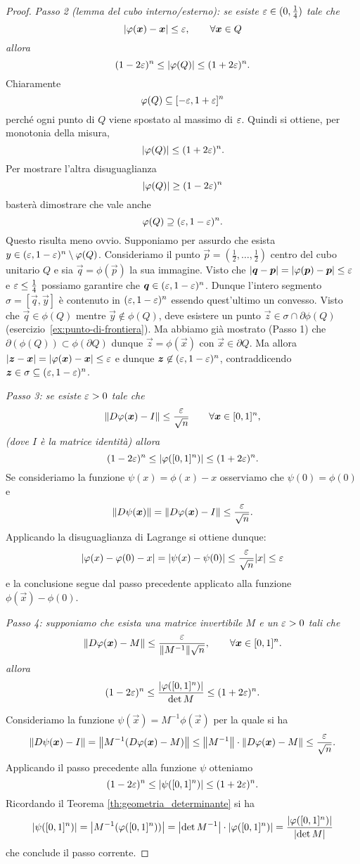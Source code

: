\begin{proof}
\emph{Passo 2 (lemma del cubo interno/esterno): 
se esiste $\varepsilon\in(0,\frac 1 4)$ tale che 
\[
  {\left|\varphi(\boldsymbol x)-\boldsymbol x\right|} \le \varepsilon, \qquad \forall \boldsymbol x \in Q
\]
allora }
\[
  (1-2\varepsilon)^n
  \le {\left|\varphi(Q)\right|}
  \le (1+2\varepsilon)^n.
\]
Chiaramente 
\[
    \varphi(Q) \subseteq [-\varepsilon,1+\varepsilon]^n
\]
perché ogni punto di $Q$ viene spostato al massimo di $\varepsilon$. 
Quindi si ottiene, per monotonia della misura,
\[
    {\left|\varphi(Q)\right|} \le (1+2\varepsilon)^n.
\]
Per mostrare l'altra disuguaglianza  
\[
   {\left|\varphi(Q)\right|} \ge (1-2\varepsilon)^n
\]
basterà dimostrare che vale anche 
\[
  \varphi(Q) \supseteq (\varepsilon,1-\varepsilon)^n.
\]
Questo risulta meno ovvio.
Supponiamo per assurdo che esista $y \in (\varepsilon,1-\varepsilon)^n \setminus \varphi(Q)$.
Consideriamo il punto $\vec p=(\frac 12, \dots, \frac 12)$ centro 
del cubo unitario $Q$ e sia $\vec q=\phi(\vec p)$ la sua immagine. 
Visto che ${\left|\boldsymbol q-\boldsymbol p\right|} = {\left|\varphi(\boldsymbol p)-\boldsymbol p\right|} \le \varepsilon$ 
e $\varepsilon \le \frac 1 4$ possiamo garantire che
$\boldsymbol q \in (\varepsilon,1-\varepsilon)^n$.
Dunque l'intero segmento $\sigma = [\vec q,\vec y]$ è contenuto 
in $(\varepsilon,1-\varepsilon)^n$ essendo quest'ultimo un convesso.
Visto che $\vec q\in \phi(Q)$ mentre $\vec y \notin \phi(Q)$,
deve esistere un punto $\vec z\in \sigma\cap \partial \phi(Q)$
(esercizio~\ref{ex:punto-di-frontiera}).
Ma abbiamo già mostrato (Passo 1) che $\partial (\phi(Q)) \subset \phi(\partial Q)$
dunque $\vec z=\phi(\vec x)$ con $\vec x \in \partial Q$. 
Ma allora ${\left|\boldsymbol z-\boldsymbol x\right|} = {\left|\varphi(\boldsymbol x)- \boldsymbol x\right|} \le \varepsilon$ 
e dunque $\boldsymbol z\not \in (\varepsilon,1-\varepsilon)^n$, 
contraddicendo $\boldsymbol z \in \sigma \subseteq (\varepsilon,1-\varepsilon)^n$.

\emph{Passo 3: se esiste $\varepsilon>0$ tale che 
\[
  {\left\Vert  D\varphi(\boldsymbol x) - I\right\Vert} \le \frac{\varepsilon}{\sqrt n} \qquad \forall \boldsymbol x \in [0,1]^n,
\]
(dove $I$ è la matrice identità)
allora
\[
 (1-2\varepsilon)^n \le {\left|\varphi([0,1]^n)\right|} \le (1+2\varepsilon)^n.
\]
}
Se consideriamo la funzione $\psi(x) = \phi(x) - x$ osserviamo che $\psi(0)=\phi(0)$ e
\[
{\left\Vert D\psi(\boldsymbol x)\right\Vert} = {\left\Vert D\varphi(\boldsymbol x) -I\right\Vert} \le \frac{\varepsilon}{\sqrt n}.
\]
Applicando la disuguaglianza di Lagrange si ottiene dunque:
\[
{\left|\varphi(x) - \varphi(0) - x\right|} = {\left|\psi(x)-\psi(0)\right|} \le \frac {\varepsilon} {\sqrt n} {\left|x\right|} \le \varepsilon
\]
e la conclusione segue dal passo precedente applicato alla funzione $\phi(\vec x) - \phi(0)$.

\emph{Passo 4: supponiamo che esista una matrice invertibile $M$ e un $\varepsilon>0$ tali che
\[
  {\left\Vert D\varphi(\boldsymbol x) - M\right\Vert} \le \frac{\varepsilon}{{\left\Vert M^{-1}\right\Vert} \sqrt n}, \qquad \forall \boldsymbol x \in [0,1]^n.
\]
allora
\[
(1-2\varepsilon)^n \le \frac{{\left|\varphi([0,1]^n)\right|}}{\det M} \le (1+2\varepsilon)^n.
\]}

Consideriamo la funzione $\psi(\vec x) = M^{-1} \phi(\vec x)$ per la quale si ha  
\[
  {\left\Vert D\psi(\boldsymbol x)-I\right\Vert} 
  = {\left\Vert M^{-1} (D\varphi(\boldsymbol x)-M)\right\Vert} 
  \le {\left\Vert M^{-1}\right\Vert} \cdot {\left\Vert D\varphi(\boldsymbol x)-M\right\Vert}
  \le \frac{\varepsilon}{\sqrt n}.
\]
Applicando il passo precedente alla funzione $\psi$ otteniamo 
\[
(1-2\varepsilon)^n \le {\left|\psi([0,1]^n)\right|} \le (1+2\varepsilon)^n.
\]
Ricordando il Teorema \ref{th:geometria_determinante} si ha
\[
  {\left|\psi([0,1]^n)\right|} = {\left|M^{-1}(\varphi([0,1]^n))\right|}
  = {\left|\det M^{-1}\right|} \cdot {\left|\varphi([0,1]^n)\right|}
  = \frac{{\left|\varphi([0,1]^n)\right|}}{{\left|\det M\right|}}
\]
che conclude il passo corrente.
\end{proof}


